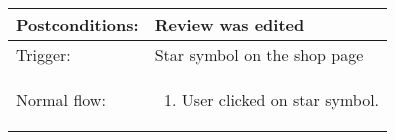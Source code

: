 \begin{longtable}{| p{3.5cm} | p{9cm} |}
\hline
Postconditions: & Review was edited \\
\hline
Trigger: &  Star symbol on the shop page\\
\hline
Normal flow: &\mbox{}\par\vspace{-\baselineskip}
\begin{enumerate}
\item User clicked on star symbol.
\end{enumerate}\\
\hline
\end{longtable}






